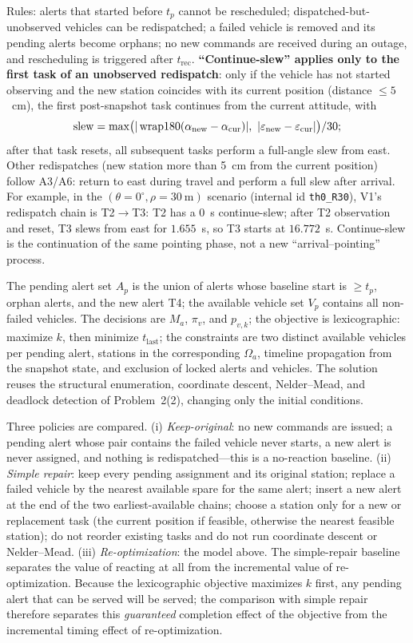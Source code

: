 Rules: alerts that started before $t_p$ cannot be rescheduled; dispatched-but-unobserved vehicles can be redispatched; a failed vehicle is removed and its pending alerts become orphans; no new commands are received during an outage, and rescheduling is triggered after $t_{\mathrm{rec}}$. \textbf{``Continue-slew'' applies only to the first task of an unobserved redispatch}: only if the vehicle has not started observing and the new station coincides with its current position (distance $\le5$~cm), the first post-snapshot task continues from the current attitude, with
\begin{equation}
  \mathrm{slew}=\max\bigl(|\wrap(\alpha_{\mathrm{new}}-\alpha_{\mathrm{cur}})|,\ |\varepsilon_{\mathrm{new}}-\varepsilon_{\mathrm{cur}}|\bigr)/30;
\end{equation}
after that task resets, all subsequent tasks perform a full-angle slew from east. Other redispatches (new station more than 5~cm from the current position) follow A3/A6: return to east during travel and perform a full slew after arrival. For example, in the $(\theta=0^\circ,\rho=30~\mathrm{m})$ scenario (internal id \texttt{th0\_R30}), V1's redispatch chain is T2$\to$T3: T2 has a $0$~s continue-slew; after T2 observation and reset, T3 slews from east for $1.655$~s, so T3 starts at $16.772$~s. Continue-slew is the continuation of the same pointing phase, not a new ``arrival--pointing'' process.

The pending alert set $A_p$ is the union of alerts whose baseline start is $\ge t_p$, orphan alerts, and the new alert T4; the available vehicle set $V_p$ contains all non-failed vehicles. The decisions are $M_a$, $\pi_v$, and $p_{v,k}$; the objective is lexicographic: maximize $k$, then minimize $t_{\mathrm{last}}$; the constraints are two distinct available vehicles per pending alert, stations in the corresponding $\Omega_a$, timeline propagation from the snapshot state, and exclusion of locked alerts and vehicles. The solution reuses the structural enumeration, coordinate descent, Nelder--Mead, and deadlock detection of Problem~2(2), changing only the initial conditions.

Three policies are compared. (i) \emph{Keep-original}: no new commands are issued; a pending alert whose pair contains the failed vehicle never starts, a new alert is never assigned, and nothing is redispatched---this is a no-reaction baseline. (ii) \emph{Simple repair}: keep every pending assignment and its original station; replace a failed vehicle by the nearest available spare for the same alert; insert a new alert at the end of the two earliest-available chains; choose a station only for a new or replacement task (the current position if feasible, otherwise the nearest feasible station); do not reorder existing tasks and do not run coordinate descent or Nelder--Mead. (iii) \emph{Re-optimization}: the model above. The simple-repair baseline separates the value of reacting at all from the incremental value of re-optimization. Because the lexicographic objective maximizes $k$ first, any pending alert that can be served will be served; the comparison with simple repair therefore separates this \emph{guaranteed} completion effect of the objective from the incremental timing effect of re-optimization.

